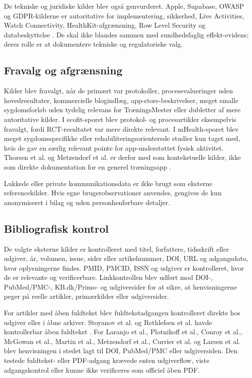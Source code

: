 De tekniske og juridiske kilder blev også genvurderet. Apple, Supabase, OWASP og GDPR-kilderne er autoritative for implementering, sikkerhed, Live Activities, Watch Connectivity, HealthKit-afgrænsning, Row Level Security og databeskyttelse \cite{apple_swiftui_docs,apple_activitykit_live_data_docs,apple_hig_live_activities,apple_healthkit_docs,apple_watchconnectivity_docs,supabase_rls_docs,supabase_securing_api_docs,owasp2024_masvs,europeanparliament2016_gdpr}. De skal ikke blandes sammen med sundhedsfaglig effekt-evidens; deres rolle er at dokumentere tekniske og regulatoriske valg.

\subsection{Fravalg og afgrænsning}

Kilder blev fravalgt, når de primært var protokoller, procesevalueringer uden hovedresultater, kommercielle blogindlæg, app-store-beskrivelser, meget smalle sygdomsforløb uden tydelig relevans for TræningsMester eller dubletter af mere autoritative kilder. I ecofit-sporet blev protokol- og procesartikler eksempelvis fravalgt, fordi RCT-resultatet var mere direkte relevant. I mHealth-sporet blev meget sygdomsspecifikke eller rehabiliteringsorienterede studier kun taget med, hvis de gav en særlig relevant pointe for app-understøttet fysisk aktivitet. Thorsen et al. og Metzendorf et al. er derfor med som kontekstuelle kilder, ikke som direkte dokumentation for en generel træningsapp \cite{thorsen2022_interwalk_app_rct,metzendorf2024_mhealth_obesity_cochrane}.

Lukkede eller private kommunikationsdata er ikke brugt som eksterne referencekilder. Hvis egne brugerobservationer anvendes, gengives de kun anonymiseret i bilag og uden personhenførbare detaljer.

\subsection{Bibliografisk kontrol}

De valgte eksterne kilder er kontrolleret med titel, forfattere, tidsskrift eller udgiver, år, volumen, issue, sider eller artikelnummer, DOI, URL og adgangsdato, hvor oplysningerne findes. PMID, PMCID, ISSN og udgiver er kontrolleret, hvor de er relevante og verificerbare. Linkkontrollen blev udført mod DOI-, PubMed/PMC-, KB.dk/Primo- og udgiversider for at sikre, at henvisningerne peger på reelle artikler, primærkilder eller udgiversider.

For artikler med åben fuldtekst blev fuldtekstadgangen kontrolleret direkte hos udgiver eller i åbne arkiver. Stoyanov et al. og Rethlefsen et al. havde kontrollerbar åben fuldtekst \cite{stoyanov2015_mobile_app_rating_scale,rethlefsen2021_prisma_s}. For Laranjo et al., Plotnikoff et al., Conroy et al., McGowan et al., Martin et al., Metzendorf et al., Currier et al. og Larsen et al. blev henvisningen i stedet lagt til DOI, PubMed/PMC eller udgiversiden. Den testede fuldtekst- eller PDF-adgang krævede enten udgiverflow, viste adgangskontrol eller kunne ikke verificeres som officiel åben PDF.
\fussy
